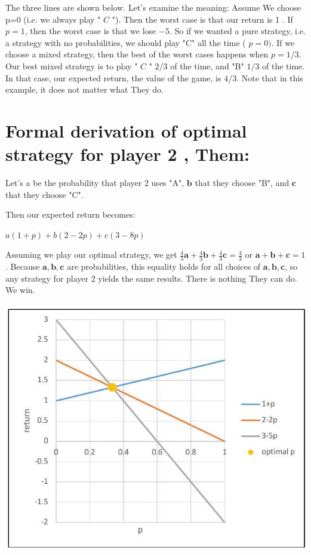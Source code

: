 \documentclass[10pt]{article}
\begin{document}
The three lines are shown below. Let's examine the meaning: Assume We choose p=0 (i.e. we always play " $C$ "). Then the worst case is that our return is 1 . If $p=1$, then the worst case is that we lose $-5$. So if we wanted a pure strategy, i.e. a strategy with no probabilities, we should play "C" all the time ( $p=0)$. If we choose a mixed strategy, then the best of the worst cases happens when $p=1 / 3$. Our best mixed strategy is to play " $C$ " $2 / 3$ of the time, and "B" $1 / 3$ of the time. In that case, our expected return, the value of the game, is $4 / 3$. Note that in this example, it does not matter what They do.

\section{Formal derivation of optimal strategy for player 2 , Them:}
Let's a be the probability that player 2 uses "A", $\mathbf{b}$ that they choose "B", and $\mathbf{c}$ that they choose "C".

Then our expected return becomes:

$a(1+p)+b(2-2 p)+c(3-8 p)$

Assuming we play our optimal strategy, we get $\frac{4}{3} \mathbf{a}+\frac{4}{3} \mathbf{b}+\frac{4}{3} \mathbf{c}=\frac{4}{3}$ or $\mathbf{a}+\mathbf{b}+\mathbf{c}=1$. Because $\mathbf{a}, \mathbf{b}, \mathbf{c}$ are probabilities, this equality holds for all choices of $\mathbf{a}, \mathbf{b}, \mathbf{c}$, so any strategy for player 2 yields the same results. There is nothing They can do. We win.

\includegraphics[max width=\textwidth]{2022_07_05_5945264bba2a5f6ba667g-71}
\end{document}
